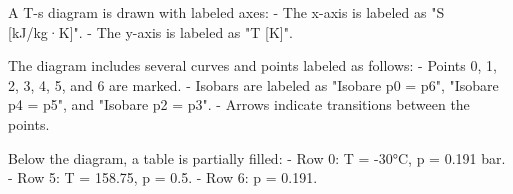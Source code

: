 A T-s diagram is drawn with labeled axes:  
- The x-axis is labeled as "S [kJ/kg·K]".  
- The y-axis is labeled as "T [K]".  

The diagram includes several curves and points labeled as follows:  
- Points 0, 1, 2, 3, 4, 5, and 6 are marked.  
- Isobars are labeled as "Isobare p0 = p6", "Isobare p4 = p5", and "Isobare p2 = p3".  
- Arrows indicate transitions between the points.  

Below the diagram, a table is partially filled:  
- Row 0: T = -30°C, p = 0.191 bar.  
- Row 5: T = 158.75, p = 0.5.  
- Row 6: p = 0.191.